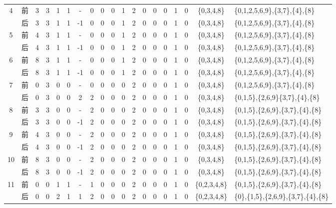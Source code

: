 \begin{table}[!htbp]
\begin{tabular}{ccccccc|cccccccccc|cl}
        \multirow{2}{*}{4} & 前 & 3 & 3 & 1 & 1 & -  & 0 & 0 & 0 & 1 & 2 & 0 & 0 & 0 & 1 & 0 & \{0,3,4,8\} & \{0,1,2,5,6,9\},\{3,7\},\{4\},\{8\} \\
                           & 后 & 3 & 3 & 1 & 1 & -1 & 0 & 0 & 0 & 1 & 2 & 0 & 0 & 0 & 1 & 0 & \{0,3,4,8\} & \{0,1,2,5,6,9\},\{3,7\},\{4\},\{8\} \\
        \midrule
        \multirow{2}{*}{5} & 前 & 4 & 3 & 1 & 1 & -  & 0 & 0 & 0 & 1 & 2 & 0 & 0 & 0 & 1 & 0 & \{0,3,4,8\} & \{0,1,2,5,6,9\},\{3,7\},\{4\},\{8\} \\
                           & 后 & 4 & 3 & 1 & 1 & -1 & 0 & 0 & 0 & 1 & 2 & 0 & 0 & 0 & 1 & 0 & \{0,3,4,8\} & \{0,1,2,5,6,9\},\{3,7\},\{4\},\{8\} \\
        \midrule
        \multirow{2}{*}{6} & 前 & 8 & 3 & 1 & 1 & -  & 0 & 0 & 0 & 1 & 2 & 0 & 0 & 0 & 1 & 0 & \{0,3,4,8\} & \{0,1,2,5,6,9\},\{3,7\},\{4\},\{8\} \\
                           & 后 & 8 & 3 & 1 & 1 & -1 & 0 & 0 & 0 & 1 & 2 & 0 & 0 & 0 & 1 & 0 & \{0,3,4,8\} & \{0,1,2,5,6,9\},\{3,7\},\{4\},\{8\} \\
        \midrule
        \multirow{2}{*}{7} & 前 & 0 & 3 & 0 & 0 & -  & 0 & 0 & 0 & 0 & 2 & 0 & 0 & 0 & 1 & 0 & \{0,3,4,8\} & \{0,1,2,5,6,9\},\{3,7\},\{4\},\{8\} \\
                           & 后 & 0 & 3 & 0 & 0 & 2  & 2 & 0 & 0 & 0 & 2 & 0 & 0 & 0 & 1 & 0 & \{0,3,4,8\} & \{0,1,5\},\{2,6,9\}\{3,7\},\{4\},\{8\} \\
        \midrule
        \multirow{2}{*}{8} & 前 & 3 & 3 & 0 & 0 & -  & 2 & 0 & 0 & 0 & 2 & 0 & 0 & 0 & 1 & 0 & \{0,3,4,8\} & \{0,1,5\},\{2,6,9\},\{3,7\},\{4\},\{8\} \\
                           & 后 & 3 & 3 & 0 & 0 & -1 & 2 & 0 & 0 & 0 & 2 & 0 & 0 & 0 & 1 & 0 & \{0,3,4,8\} & \{0,1,5\},\{2,6,9\},\{3,7\},\{4\},\{8\} \\
        \midrule
        \multirow{2}{*}{9} & 前 & 4 & 3 & 0 & 0 & -  & 2 & 0 & 0 & 0 & 2 & 0 & 0 & 0 & 1 & 0 & \{0,3,4,8\} & \{0,1,5\},\{2,6,9\},\{3,7\},\{4\},\{8\} \\
                           & 后 & 4 & 3 & 0 & 0 & -1 & 2 & 0 & 0 & 0 & 2 & 0 & 0 & 0 & 1 & 0 & \{0,3,4,8\} & \{0,1,5\},\{2,6,9\},\{3,7\},\{4\},\{8\} \\
        \midrule
        \multirow{2}{*}{10}& 前 & 8 & 3 & 0 & 0 & -  & 2 & 0 & 0 & 0 & 2 & 0 & 0 & 0 & 1 & 0 & \{0,3,4,8\} & \{0,1,5\},\{2,6,9\},\{3,7\},\{4\},\{8\} \\
                           & 后 & 8 & 3 & 0 & 0 & -1 & 2 & 0 & 0 & 0 & 2 & 0 & 0 & 0 & 1 & 0 & \{0,3,4,8\} & \{0,1,5\},\{2,6,9\},\{3,7\},\{4\},\{8\} \\
        \midrule
        \multirow{2}{*}{11}& 前 & 0 & 0 & 1 & 1 & -  & 1 & 0 & 0 & 0 & 2 & 0 & 0 & 0 & 1 & 0 & \{0,2,3,4,8\} & \{0,1,5\},\{2,6,9\},\{3,7\},\{4\},\{8\} \\
                           & 后 & 0 & 0 & 2 & 1 & 1  & 2 & 0 & 0 & 0 & 2 & 0 & 0 & 0 & 1 & 0 & \{0,2,3,4,8\} & \{0\},\{1,5\},\{2,6,9\},\{3,7\},\{4\},\{8\} \\
        \midrule
        

\end{tabular}
\end{table}
